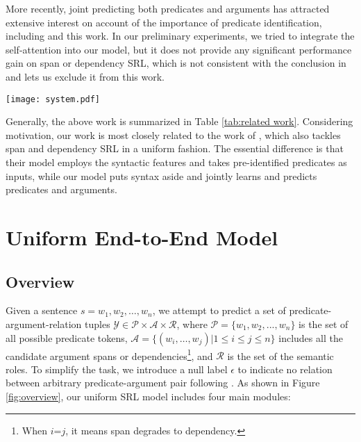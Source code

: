 \documentclass[letterpaper]{article} \usepackage{aaai19}  \usepackage{times}  \usepackage{helvet}  \usepackage{courier}  \usepackage{url}  \usepackage{graphicx}  \frenchspacing  \setlength{\pdfpagewidth}{8.5in}  \setlength{\pdfpageheight}{11in}
\begin{document}
More recently, joint predicting both predicates and arguments has attracted extensive interest on account of the importance of predicate identification, including \cite{he-acl2017,Strubell2018,he2018jointly,cai2018full} and this work.
In our preliminary experiments, we tried to integrate the self-attention into our model,
but it does not provide any significant performance gain on span or dependency SRL, which is not consistent with the conclusion in \cite{selfatt2018} and lets us exclude it from this work. 




\begin{figure*}
	\centering
	\texttt{[image: system.pdf]}
	\caption{\label{fig:overview} The framework of our end-to-end model for uniform SRL.}
\end{figure*}


Generally, the above work is summarized in Table \ref{tab:related work}. Considering motivation, our work is most closely related to the work of \citeauthor{Fitzgerald2015} , which also tackles span and dependency SRL in a uniform fashion. The essential difference is that their model employs the syntactic features and takes pre-identified predicates as inputs, while our model puts syntax aside and jointly learns and predicts predicates and arguments. 







\section{Uniform End-to-End Model}




\subsection{Overview}

Given a sentence $s=w_1, w_2, \dots, w_n$, we attempt to predict a set of predicate-argument-relation tuples $\mathcal{Y} \in \mathcal{P} \times \mathcal{A} \times \mathcal{R}$, where $\mathcal{P} = \{w_1, w_2, ..., w_n\}$ is the set of all possible predicate tokens, $\mathcal{A} = \{(w_i,\dots,w_j) | 1 \leq i \leq j \leq n \}$ includes all the candidate argument spans or dependencies\footnote{When $i$=$j$, it means span degrades to dependency.}, and $\mathcal{R}$ is the set of the semantic roles. To simplify the task, we introduce a null label $\epsilon$ to indicate no relation between arbitrary predicate-argument pair following \citeauthor{he2018jointly} . As shown in Figure \ref{fig:overview}, our uniform SRL model includes four main modules: 
\end{document}

